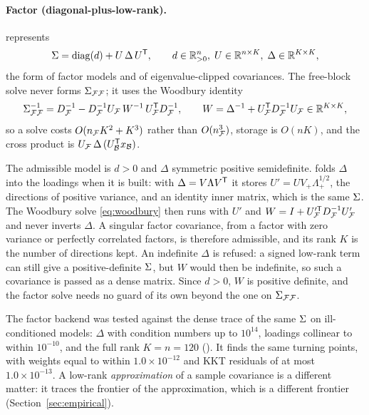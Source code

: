 \paragraph{Factor (diagonal-plus-low-rank).}
 represents
\begin{equation}
\label{eq:factor}
\Sigma = \operatorname{diag}(d) + U\,\Delta\,U^{\mathsf{T}},
\qquad d\in\mathbb{R}^{n}_{>0},\; U\in\mathbb{R}^{n\times K},\; \Delta\in\mathbb{R}^{K\times K},
\end{equation}
the form of factor models \citep{sharpe1963} and of eigenvalue-clipped covariances. The
free-block solve never forms $\Sigma_{\mathcal{F}\mathcal{F}}$; it uses the Woodbury identity
\begin{equation}
\label{eq:woodbury}
\Sigma_{\mathcal{F}\mathcal{F}}^{-1} = D_{\mathcal{F}}^{-1} - D_{\mathcal{F}}^{-1} U_{\mathcal{F}}\, W^{-1}\, U_{\mathcal{F}}^{\mathsf{T}} D_{\mathcal{F}}^{-1},
\qquad
W = \Delta^{-1} + U_{\mathcal{F}}^{\mathsf{T}} D_{\mathcal{F}}^{-1} U_{\mathcal{F}} \in\mathbb{R}^{K\times K},
\end{equation}
so a solve costs $O(n_{\mathcal{F}} K^2 + K^3)$ rather than $O(n_{\mathcal{F}}^3)$, storage is $O(nK)$, and
the cross product is $U_{\mathcal{F}}\,\Delta\,(U_{\mathcal{B}}^{\mathsf{T}} x_{\mathcal{B}})$.

The admissible model is $d > 0$ and $\Delta$ symmetric positive semidefinite.
 folds $\Delta$ into the loadings when it is built: with
$\Delta = V\Lambda V^{\mathsf{T}}$ it stores $U' = U V_+ \Lambda_+^{1/2}$, the directions of
positive variance, and an identity inner matrix, which is the same $\Sigma$. The
Woodbury solve \eqref{eq:woodbury} then runs with $U'$ and $W = I + U_{\mathcal{F}}'^{\mathsf{T}}
D_{\mathcal{F}}^{-1} U_{\mathcal{F}}'$ and never inverts $\Delta$. A singular factor covariance, from a factor
with zero variance or perfectly correlated factors, is therefore admissible, and its rank
$K$ is the number of directions kept. An indefinite $\Delta$ is refused: a signed
low-rank term can still give a positive-definite $\Sigma$, but $W$ would then be
indefinite, so such a covariance is passed as a dense matrix. Since $d > 0$, $W$ is
positive definite, and the factor solve needs no guard of its own beyond the one on
$\Sigma_{\mathcal{F}\mathcal{F}}$.

The factor backend was tested against the dense trace of the same $\Sigma$ on
ill-conditioned models: $\Delta$ with condition numbers up to $10^{14}$, loadings
collinear to within $10^{-10}$, and the full rank $K = n = 120$
(). It finds the same turning points, with weights equal to within
$1.0\times10^{-12}$ and KKT residuals of at most $1.0\times10^{-13}$. A low-rank
\emph{approximation} of a sample covariance is a different matter: it traces the
frontier of the approximation, which is a different frontier
(Section~\ref{sec:empirical}).

